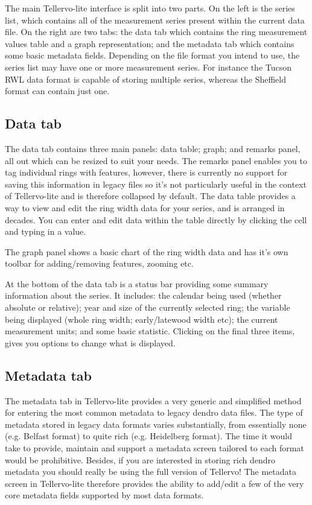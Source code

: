 The main Tellervo-lite interface is split into two parts.  On the left is the series list, which contains all of the measurement series present within the current data file.  On the right are two tabs: the data tab which contains the ring measurement values table and a graph representation; and the metadata tab which contains some basic metadata fields.  Depending on the file format you intend to use, the series list may have one or more measurement series.  For instance the Tucson RWL data format is capable of storing multiple series, whereas the Sheffield format can contain just one.

\subsection{Data tab}

The data tab contains three main panels: data table; graph; and remarks panel, all out which can be resized to suit your needs.  The remarks panel enables you to tag individual rings with features, however, there is currently no support for saving this information in legacy files so it's not particularly useful in the context of Tellervo-lite and is therefore collapsed by default.  The data table provides a way to view and edit the ring width data for your series, and is arranged in decades.  You can enter and edit data within the table directly by clicking the cell and typing in a value.

The graph panel shows a basic chart of the ring width data and has it's own toolbar for adding/removing features, zooming etc.

At the bottom of the data tab is a status bar providing some summary information about the series.  It includes: the calendar being used (whether absolute or relative); year and size of the currently selected ring; the variable being displayed (whole ring width; early/latewood width etc); the current measurement units; and some basic statistic.  Clicking on the final three items, gives you options to change what is displayed.


\subsection{Metadata tab}

The metadata tab in Tellervo-lite provides a very generic and simplified method for entering the most common metadata to legacy dendro data files.  The type of metadata stored in legacy data formats varies substantially, from essentially none (e.g. Belfast format) to quite rich (e.g. Heidelberg format).  The time it would take to provide, maintain and support a metadata screen tailored to each format would be prohibitive.  Besides, if you are interested in storing rich dendro metadata you should really be using the full version of Tellervo!  The metadata screen in Tellervo-lite therefore provides the ability to add/edit a few of the very core metadata fields supported by most data formats.

